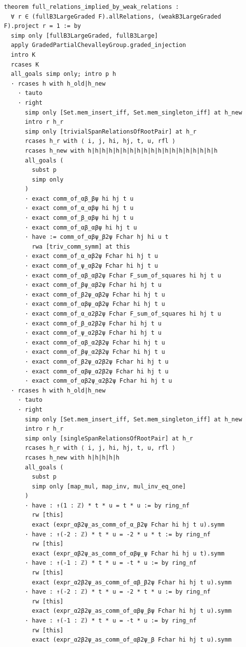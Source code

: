 \documentclass[10pt,a4paper]{article}
\begin{document}
\begin{Verbatim}
theorem full_relations_implied_by_weak_relations :
  ∀ r ∈ (fullB3LargeGraded F).allRelations, (weakB3LargeGraded F).project r = 1 := by
  simp only [fullB3LargeGraded, fullB3Large]
  apply GradedPartialChevalleyGroup.graded_injection
  intro K
  rcases K
  all_goals simp only; intro p h
  · rcases h with h_old|h_new
    · tauto
    · right
      simp only [Set.mem_insert_iff, Set.mem_singleton_iff] at h_new
      intro r h_r
      simp only [trivialSpanRelationsOfRootPair] at h_r
      rcases h_r with ⟨ i, j, hi, hj, t, u, rfl ⟩
      rcases h_new with h|h|h|h|h|h|h|h|h|h|h|h|h|h|h|h|h|h|h
      all_goals (
        subst p
        simp only
      )
      · exact comm_of_αβ_βψ hi hj t u
      · exact comm_of_α_αβψ hi hj t u
      · exact comm_of_β_αβψ hi hj t u
      · exact comm_of_αβ_αβψ hi hj t u
      · have := comm_of_αβψ_β2ψ Fchar hj hi u t
        rwa [triv_comm_symm] at this
      · exact comm_of_α_αβ2ψ Fchar hi hj t u
      · exact comm_of_ψ_αβ2ψ Fchar hi hj t u
      · exact comm_of_αβ_αβ2ψ Fchar F_sum_of_squares hi hj t u
      · exact comm_of_βψ_αβ2ψ Fchar hi hj t u
      · exact comm_of_β2ψ_αβ2ψ Fchar hi hj t u
      · exact comm_of_αβψ_αβ2ψ Fchar hi hj t u
      · exact comm_of_α_α2β2ψ Fchar F_sum_of_squares hi hj t u
      · exact comm_of_β_α2β2ψ Fchar hi hj t u
      · exact comm_of_ψ_α2β2ψ Fchar hi hj t u
      · exact comm_of_αβ_α2β2ψ Fchar hi hj t u
      · exact comm_of_βψ_α2β2ψ Fchar hi hj t u
      · exact comm_of_β2ψ_α2β2ψ Fchar hi hj t u
      · exact comm_of_αβψ_α2β2ψ Fchar hi hj t u
      · exact comm_of_αβ2ψ_α2β2ψ Fchar hi hj t u
  · rcases h with h_old|h_new
    · tauto
    · right
      simp only [Set.mem_insert_iff, Set.mem_singleton_iff] at h_new
      intro r h_r
      simp only [singleSpanRelationsOfRootPair] at h_r
      rcases h_r with ⟨ i, j, hi, hj, t, u, rfl ⟩
      rcases h_new with h|h|h|h|h
      all_goals (
        subst p
        simp only [map_mul, map_inv, mul_inv_eq_one]
      )
      · have : ↑(1 : ℤ) * t * u = t * u := by ring_nf
        rw [this]
        exact (expr_αβ2ψ_as_comm_of_α_β2ψ Fchar hi hj t u).symm
      · have : ↑(-2 : ℤ) * t * u = -2 * u * t := by ring_nf
        rw [this]
        exact (expr_αβ2ψ_as_comm_of_αβψ_ψ Fchar hi hj u t).symm
      · have : ↑(-1 : ℤ) * t * u = -t * u := by ring_nf
        rw [this]
        exact (expr_α2β2ψ_as_comm_of_αβ_β2ψ Fchar hi hj t u).symm
      · have : ↑(-2 : ℤ) * t * u = -2 * t * u := by ring_nf
        rw [this]
        exact (expr_α2β2ψ_as_comm_of_αβψ_βψ Fchar hi hj t u).symm
      · have : ↑(-1 : ℤ) * t * u = -t * u := by ring_nf
        rw [this]
        exact (expr_α2β2ψ_as_comm_of_αβ2ψ_β Fchar hi hj t u).symm

\end{Verbatim}
\end{document}
